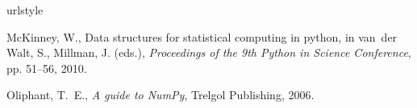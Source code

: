 \begin{thebibliography}{1}
\providecommand{\url}[1]{\texttt{#1}}
\providecommand{\urlprefix}{URL }
\expandafter\ifx\csname urlstyle\endcsname\relax
  \providecommand{\doi}[1]{doi:\discretionary{}{}{}#1}\else
  \providecommand{\doi}{doi:\discretionary{}{}{}\begingroup
  \urlstyle{rm}\Url}\fi

McKinney, W., Data structures for statistical computing in python, in van~der
  Walt, S., Millman, J. (eds.), \emph{Proceedings of the 9th Python in Science
  Conference}, pp. 51--56, 2010.

Oliphant, T.~E., \emph{A guide to {NumPy}}, Trelgol Publishing, 2006.

\end{thebibliography}

\endinput
